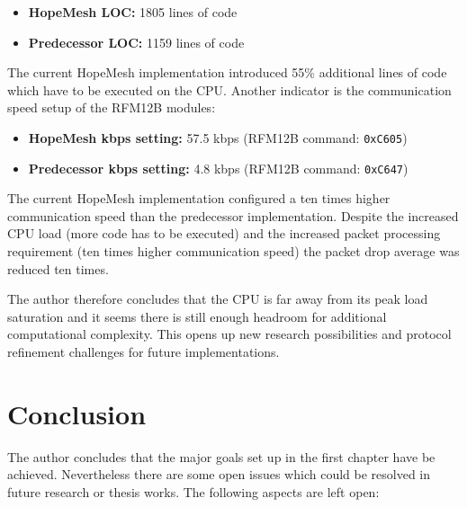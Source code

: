 \begin{itemize}
    \item \textbf{HopeMesh LOC:} 1805 lines of code
    \item \textbf{Predecessor LOC:} 1159 lines of code
\end{itemize}

The current HopeMesh implementation introduced 55\% additional lines of code which have to be executed on the CPU. Another indicator is the communication speed setup of the RFM12B modules:

\begin{itemize}
    \item \textbf{HopeMesh kbps setting:} 57.5 kbps (RFM12B command: \texttt{0xC605})
    \item \textbf{Predecessor kbps setting:} 4.8 kbps (RFM12B command: \texttt{0xC647})
\end{itemize}

The current HopeMesh implementation configured a ten times higher communication speed than the predecessor implementation. Despite the increased CPU load (more code has to be executed) and the increased packet processing requirement (ten times higher communication speed) the packet drop average was reduced ten times.

The author therefore concludes that the CPU is far away from its peak load saturation and it seems there is still enough headroom for additional computational complexity. This opens up new research possibilities and protocol refinement challenges for future implementations.

\chapter{Conclusion}%
The author concludes that the major goals set up in the first chapter have be achieved. Nevertheless there are some open issues which could be resolved in future research or thesis works. The following aspects are left open:

